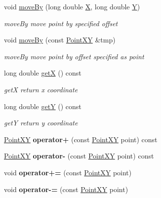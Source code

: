 \begin{DoxyCompactItemize}
void \hyperlink{classPointXY_a2be0c9202aaa1963faa32f84ba8f5573}{move\+By} (long double \hyperlink{classPointXY_a134e66580fce7d7c4c7f0a6fb80f3040}{X}, long double \hyperlink{classPointXY_a9e1a37c00a0fec942609fcd9185d1a10}{Y})
\begin{DoxyCompactList}\small\item\em move\+By move point by specified offset \end{DoxyCompactList}\item 
void \hyperlink{classPointXY_a8a020ce7e0ea6b7b694555d21d8e780c}{move\+By} (const \hyperlink{classPointXY}{Point\+X\+Y} \&tmp)
\begin{DoxyCompactList}\small\item\em move\+By move point by offset specified as point \end{DoxyCompactList}\item 
long double \hyperlink{classPointXY_ad0a3960b3701e91d54ff2533c5b69809}{get\+X} () const 
\begin{DoxyCompactList}\small\item\em get\+X return x coordinate \end{DoxyCompactList}\item 
long double \hyperlink{classPointXY_ad0d22647ef668ea39a630bac5bb1c046}{get\+Y} () const 
\begin{DoxyCompactList}\small\item\em get\+Y return y coordinate \end{DoxyCompactList}\item 
\hypertarget{classPointXY_ab543f519c25866bd1c9d04c093d20478}{}\hyperlink{classPointXY}{Point\+X\+Y} {\bfseries operator+} (const \hyperlink{classPointXY}{Point\+X\+Y} point) const \label{classPointXY_ab543f519c25866bd1c9d04c093d20478}

\item 
\hypertarget{classPointXY_a7b138c1896e62a8f920ed4f797b3cbfe}{}\hyperlink{classPointXY}{Point\+X\+Y} {\bfseries operator-\/} (const \hyperlink{classPointXY}{Point\+X\+Y} point) const \label{classPointXY_a7b138c1896e62a8f920ed4f797b3cbfe}

\item 
\hypertarget{classPointXY_ab126ab992e6fbeff7c39487fa94a8827}{}void {\bfseries operator+=} (const \hyperlink{classPointXY}{Point\+X\+Y} point)\label{classPointXY_ab126ab992e6fbeff7c39487fa94a8827}

\item 
\hypertarget{classPointXY_aadf351c6944336e734950093d031cc5a}{}void {\bfseries operator-\/=} (const \hyperlink{classPointXY}{Point\+X\+Y} point)\label{classPointXY_aadf351c6944336e734950093d031cc5a}


\end{DoxyCompactItemize}
